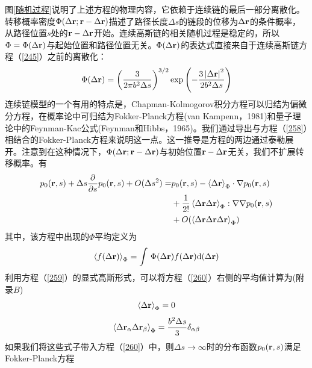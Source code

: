 图\ref{随机过程}说明了上述方程的物理内容，它依赖于连续链的最后一部分离散化。转移概率密度$\Phi(\Delta \mathbf{r} ;\mathbf{r} -\Delta \mathbf{r} )$描述了路径长度$\Delta s$的链段的位移为$\Delta \mathbf{r} $的条件概率，从路径位置$s$处的$\mathbf{r} -\Delta \mathbf{r} $开始。连续高斯链的相关随机过程是稳定的，所以$\Phi =\Phi(\Delta \mathbf{r} )$与起始位置和路径位置无关。$\Phi(\Delta \mathbf{r} )$的表达式直接来自于连续高斯链方程（\ref{245}）之前的离散化：
\begin{equation}\label{259}
\Phi(\Delta \mathbf{r} )=\left( \frac{3}{2\pi b^2 \Delta s} \right)^{3/2}\exp \left(- \frac{3\left| \Delta \mathbf{r}  \right|^2}{2b^2 \Delta s} \right) 
\end{equation}
连续链模型的一个有用的特点是，Chapman-Kolmogorov积分方程可以归结为偏微分方程，在概率论中可归结为Fokker-Planck方程(van Kampenn，1981)和量子理论中的Feynman-Kac公式(Feynman和Hibbs，1965)。我们通过导出与方程（\ref{258}）相结合的Fokker-Planck方程来说明这一点。这一推导是方程的两边通过泰勒展开。注意到在这种情况下，$\Phi(\Delta \mathbf{r} ;\mathbf{r} -\Delta \mathbf{r} )$与初始位置$\mathbf{r} -\Delta \mathbf{r} $无关，我们不扩展转移概率。有
\begin{equation}\label{260}
\begin{aligned}
p_0(\mathbf{r} ,s)+\Delta s\frac{\partial}{\partial s}p_0(\mathbf{r} ,s)+O(\Delta s^2)=&p_0(\mathbf{r} ,s)-\left \langle \Delta \mathbf{r}  \right \rangle _\Phi \cdot \nabla p_0 (\mathbf{r} ,s)\\ &+\frac{1}{2!}\left \langle \Delta \mathbf{r}   \Delta \mathbf{r}  \right \rangle _\Phi:\nabla \nabla p_0(\mathbf{r} ,s)\\ &+O(\left \langle \Delta \mathbf{r}   \Delta \mathbf{r}   \Delta \mathbf{r}  \right \rangle _\Phi)
\end{aligned}
\end{equation}
其中，该方程中出现的$\Phi$平均定义为
\begin{equation}\label{261}
\left \langle f(\Delta \mathbf{r} ) \right \rangle _\Phi = \int \,\Phi (\Delta \mathbf{r} )f(\Delta \mathbf{r} ) \mathrm{d}(\Delta \mathbf{r} )
\end{equation}
利用方程（\ref{259}）的显式高斯形式，可以将方程（\ref{260}）右侧的平均值计算为(附录$B$)
\begin{equation}\label{262}
\left \langle \Delta \mathbf{r}  \right \rangle _\Phi = 0
\end{equation}
\begin{equation}\label{263}
\left \langle \Delta \mathbf{r} _\alpha \Delta \mathbf{r} _\beta \right \rangle _\Phi = \frac{b^2 \Delta s}{3}\delta_{\alpha \beta}
\end{equation}
如果我们将这些式子带入方程（\ref{260}）中，则$\Delta s \rightarrow \infty$时的分布函数$p_0(\mathbf{r} ,s)$满足Fokker-Planck方程

